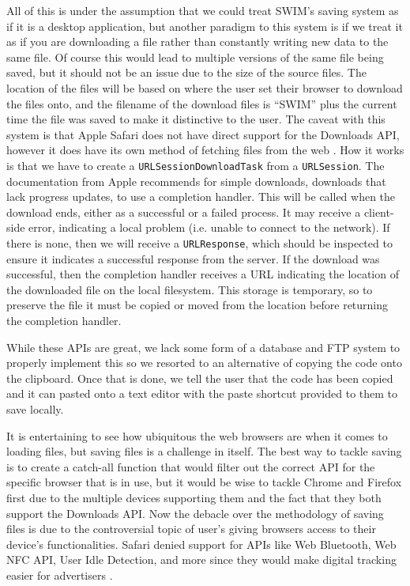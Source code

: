 \documentclass[
    paper=letter,
    parskip=half,
    fontsize=12pt,
    titlepage=firstiscover,
    toc=bibliography,
    numbers=endperiod
]{scrartcl}
\begin{document}
All of this is under the assumption that we could treat SWIM's saving
system as if it is a desktop application, but another paradigm to this
system is if we treat it as if you are downloading a file rather than
constantly writing new data to the same file. Of course this would lead
to multiple versions of the same file being saved, but it should not be
an issue due to the size of the source files. The location of the files
will be based on where the user set their browser to download the files
onto, and the filename of the download files is ``SWIM'' plus the
current time the file was saved to make it distinctive to the user. The
caveat with this system is that Apple Safari does not have direct
support for the Downloads API, however it does have its own method of
fetching files from the web \cite{apple-downloading}. How it works is
that we have to create a \texttt{URLSessionDownloadTask} from a
\texttt{URLSession}. The documentation from Apple recommends for simple
downloads, downloads that lack progress updates, to use a completion
handler. This will be called when the download ends, either as a
successful or a failed process. It may receive a client-side error,
indicating a local problem (i.e. unable to connect to the network). If
there is none, then we will receive a \texttt{URLResponse}, which should
be inspected to ensure it indicates a successful response from the
server. If the download was successful, then the completion handler
receives a URL indicating the location of the downloaded file on the
local filesystem. This storage is temporary, so to preserve the file it
must be copied or moved from the location before returning the
completion handler.

While these APIs are great, we lack some form of a database and FTP
system to properly implement this so we resorted to an alternative of
copying the code onto the clipboard. Once that is done, we tell the user
that the code has been copied and it can pasted onto a text editor with
the paste shortcut provided to them to save locally.

It is entertaining to see how ubiquitous the web browsers are when it
comes to loading files, but saving files is a challenge in itself. The
best way to tackle saving is to create a catch-all function that would
filter out the correct API for the specific browser that is in use, but
it would be wise to tackle Chrome and Firefox first due to the multiple
devices supporting them and the fact that they both support the
Downloads API. Now the debacle over the methodology of saving files is
due to the controversial topic of user's giving browsers access to their
device's functionalities. Safari denied support for APIs like Web
Bluetooth, Web NFC API, User Idle Detection, and more since they would
make digital tracking easier for advertisers \cite{cimpanu2020}.
\end{document}

